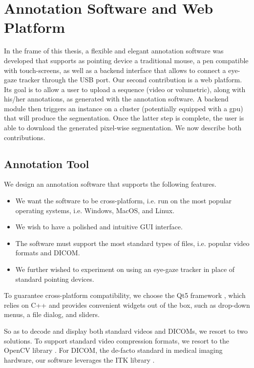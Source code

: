 \section{Annotation Software and Web Platform}
In the frame of this thesis, a flexible and elegant annotation software was developed that supports as pointing device a traditional mouse, a pen compatible with touch-screens, as well as a backend interface that allows to connect a eye-gaze tracker through the USB port.
Our second contribution is a web platform.
Its goal is to allow a user to upload a sequence (video or volumetric), along with his/her annotations, as generated with the annotation software.
A backend module then triggers an instance on a cluster (potentially equipped with a \gls{gpu}) that will produce the segmentation.
Once the latter step is complete, the user is able to download the generated pixel-wise segmentation.
We now describe both contributions.

\subsection{Annotation Tool}
\label{sec:anna}

We design an annotation software that supports the following features.

\begin{itemize}
    \item We want the software to be cross-platform, i.e. run on the most popular operating systems, i.e. Windows, MacOS, and Linux.
    \item We wish to have a polished and intuitive GUI interface.
    \item The software must support the most standard types of files, i.e. popular video formats and DICOM.
    \item We further wished to experiment on using an eye-gaze tracker in place of standard pointing devices.
\end{itemize}

To guarantee cross-platform compatibility, we choose the Qt5 framework \cite{eng16}, which relies on C++ and provides convenient widgets out of the box, such as drop-down menus, a file dialog, and sliders.

So as to decode and display both standard videos and DICOMs, we resort to two solutions.
To support standard video compression formats, we resort to the OpenCV library \cite{opencv}.
For DICOM, the de-facto standard in medical imaging hardware, our software leverages the ITK library \cite{johnson15}.

